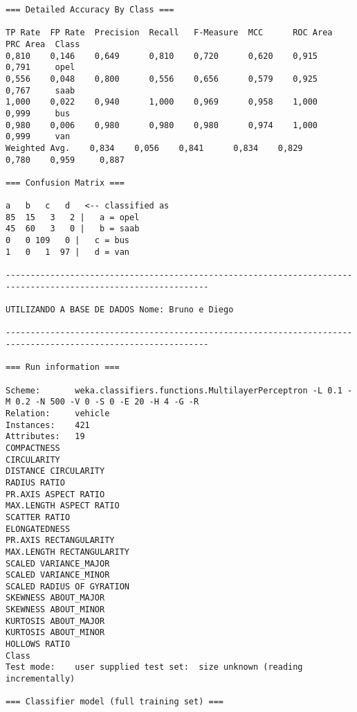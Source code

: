 \documentclass[
	article,			%
	11pt,				%
	oneside,			%
	a4paper,			%
	english,			%
	brazil,				%
	sumario=tradicional
	]{abntex2}
\begin{document}
\begin{lstlisting}
=== Detailed Accuracy By Class ===

TP Rate  FP Rate  Precision  Recall   F-Measure  MCC      ROC Area  PRC Area  Class
0,810    0,146    0,649      0,810    0,720      0,620    0,915     0,791     opel
0,556    0,048    0,800      0,556    0,656      0,579    0,925     0,767     saab
1,000    0,022    0,940      1,000    0,969      0,958    1,000     0,999     bus
0,980    0,006    0,980      0,980    0,980      0,974    1,000     0,999     van
Weighted Avg.    0,834    0,056    0,841      0,834    0,829      0,780    0,959     0,887     

=== Confusion Matrix ===

a   b   c   d   <-- classified as
85  15   3   2 |   a = opel
45  60   3   0 |   b = saab
0   0 109   0 |   c = bus
1   0   1  97 |   d = van

---------------------------------------------------------------------------------------------------------------

UTILIZANDO A BASE DE DADOS Nome: Bruno e Diego

---------------------------------------------------------------------------------------------------------------

=== Run information ===

Scheme:       weka.classifiers.functions.MultilayerPerceptron -L 0.1 -M 0.2 -N 500 -V 0 -S 0 -E 20 -H 4 -G -R
Relation:     vehicle
Instances:    421
Attributes:   19
COMPACTNESS
CIRCULARITY
DISTANCE CIRCULARITY
RADIUS RATIO
PR.AXIS ASPECT RATIO
MAX.LENGTH ASPECT RATIO
SCATTER RATIO
ELONGATEDNESS
PR.AXIS RECTANGULARITY
MAX.LENGTH RECTANGULARITY
SCALED VARIANCE_MAJOR
SCALED VARIANCE_MINOR
SCALED RADIUS OF GYRATION
SKEWNESS ABOUT_MAJOR
SKEWNESS ABOUT_MINOR
KURTOSIS ABOUT_MAJOR
KURTOSIS ABOUT_MINOR
HOLLOWS RATIO
Class
Test mode:    user supplied test set:  size unknown (reading incrementally)

=== Classifier model (full training set) ===


\end{lstlisting}
\end{document}
